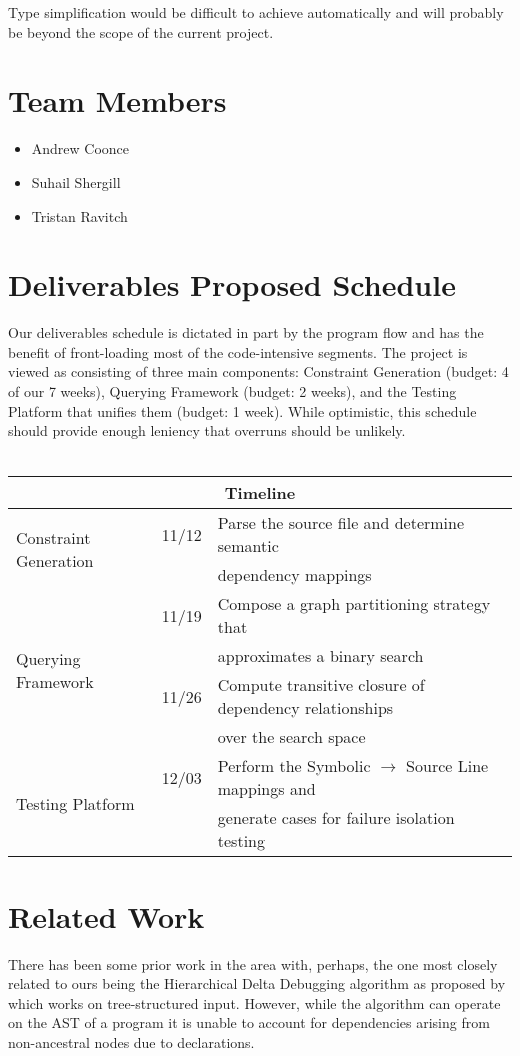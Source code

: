 \documentclass[11pt]{article}
\begin{document}
Type simplification would be difficult to achieve automatically and will
probably be beyond the scope of the current project.


\section{Team Members}
\begin{itemize}
\item{Andrew Coonce}
\item{Suhail Shergill}
\item{Tristan Ravitch}
\end{itemize}

\section{Deliverables Proposed Schedule}
Our deliverables schedule is dictated in part by the program flow and has the
benefit of front-loading most of the code-intensive segments. The project is
viewed as consisting of three main components: Constraint Generation (budget: 4
of our 7 weeks), Querying Framework (budget: 2 weeks), and the Testing Platform
that unifies them (budget: 1 week). While optimistic, this schedule should
provide enough leniency that overruns should be unlikely.  \\ \\
\begin{tabular}{|l|l|l|}
\hline
\multicolumn{3}{|c|}{Timeline} \\
\hline
\multirow{2}{*}{Constraint Generation} & 11/12 &
Parse the source file and determine semantic \\
 & & dependency mappings \\ \hline
\multirow{4}{*}{Querying Framework} & 11/19 & Compose a graph partitioning
strategy that \\
 & & approximates a binary search \\
 & 11/26 & Compute transitive closure of dependency relationships \\
 & & over the search space \\ \hline
\multirow{2}{*}{Testing Platform} & 12/03 & Perform the Symbolic $\rightarrow$
Source Line mappings and \\
 & & generate cases for failure isolation testing \\ \hline
\end{tabular}



\section{Related Work}
There has been some prior work in the area with, perhaps, the one most closely
related to ours being the Hierarchical Delta Debugging algorithm as proposed by
\citet{hdd} which works on tree-structured input. However, while
the algorithm can operate on the AST of a program it is unable to account for
dependencies arising from non-ancestral nodes due to declarations.
\end{document}
